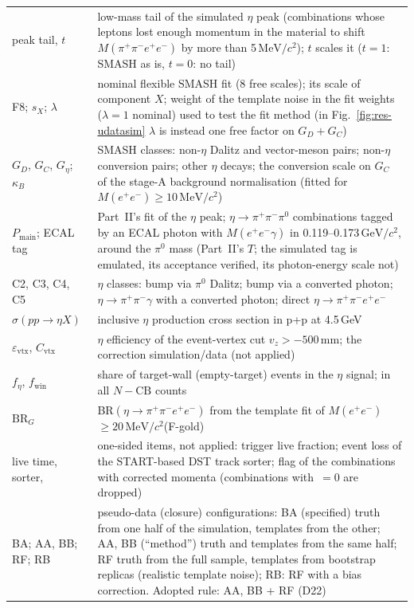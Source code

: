\documentclass[11pt,a4paper]{article}
\newcommand{\piz}{\ensuremath{\pi^{0}}\xspace}
\newcommand{\ee}{\ensuremath{e^{+}e^{-}}\xspace}
\newcommand{\pipi}{\ensuremath{\pi^{+}\pi^{-}}\xspace}
\newcommand{\ppee}{\ensuremath{\pi^{+}\pi^{-}e^{+}e^{-}}\xspace}
\newcommand{\Mfour}{\ensuremath{M(\pi^{+}\pi^{-}e^{+}e^{-})}\xspace}
\newcommand{\Mee}{\ensuremath{M(e^{+}e^{-})}\xspace}
\newcommand{\GeVcc}{\ensuremath{\mathrm{GeV}/c^{2}}\xspace}
\newcommand{\MeVcc}{\ensuremath{\mathrm{MeV}/c^{2}}\xspace}
\newcommand{\code}[1]{\texttt{\detokenize{#1}}}
\newcommand{\vz}{\ensuremath{v_z}\xspace}
\newcommand{\Pmain}{\ensuremath{P_{\mathrm{main}}}\xspace}
\newcommand{\kB}{\ensuremath{\kappa_B}\xspace}
\newcommand{\feta}{\ensuremath{f_\eta}\xspace}
\newcommand{\fwin}{\ensuremath{f_{\mathrm{win}}}\xspace}
\newcommand{\BRG}{\ensuremath{\mathrm{BR}_G}\xspace}
\newcommand{\sigeta}{\ensuremath{\sigma(pp\to\eta X)}\xspace}
\newcommand{\Geta}{\ensuremath{G_\eta}\xspace}
\begin{document}
{\begin{longtable}{@{}>{\raggedright\arraybackslash}p{3.3cm} >{\raggedright\arraybackslash}p{\dimexpr\textwidth-3.3cm-2\tabcolsep\relax}@{}}
peak tail, $t$ & low-mass tail of the simulated $\eta$ peak (combinations whose leptons lost enough momentum in the material to shift \Mfour by more
than 5\,\MeVcc); $t$ scales it ($t=1$: SMASH as is, $t=0$: no tail) \\
F8; $s_X$; $\lambda$ & nominal flexible SMASH fit (8 free scales); its scale of component $X$; weight of the template noise in the fit weights
($\lambda=1$ nominal) used to test the fit method (in Fig.~\ref{fig:res-udatasim} $\lambda$ is instead one free factor on $G_D+G_C$) \\
$G_D$, $G_C$, \Geta; \kB & SMASH classes: non-$\eta$ Dalitz and vector-meson pairs; non-$\eta$ conversion pairs; other $\eta$ decays; the
conversion scale on $G_C$ of the stage-A background normalisation (fitted for \Mee$\ge10$\,\MeVcc) \\
\Pmain; ECAL tag & Part~II's fit of the $\eta$ peak; $\eta\to\pipi\piz$ combinations tagged by an ECAL photon with $M(\ee\gamma)$ in
0.119--0.173\,\GeVcc, around the \piz mass (Part~II's $T$; the simulated tag is emulated, its acceptance verified, its photon-energy
scale not) \\
C2, C3, C4, C5 & $\eta$ classes: bump via \piz Dalitz; bump via a converted photon; $\eta\to\pipi\gamma$ with a converted photon; direct $\eta\to\ppee$ \\
\sigeta & inclusive $\eta$ production cross section in p+p at 4.5\,GeV \\
$\varepsilon_{\mathrm{vtx}}$, $C_{\mathrm{vtx}}$ & $\eta$ efficiency of the event-vertex cut $\vz>-500$\,mm; the correction simulation/data (not applied) \\
\feta, \fwin & share of target-wall (empty-target) events in the $\eta$ signal; in all $N-\mathrm{CB}$ counts \\
\BRG & BR$(\eta\to\ppee)$ from the template fit of \Mee$\ge20$\,\MeVcc (F-gold) \\
live time, sorter, \code{cor_ok} & one-sided items, not applied: trigger live fraction; event loss of the START-based DST track sorter; flag of
the combinations with corrected momenta (combinations with \code{cor_ok}$\,=0$ are dropped) \\
BA; AA, BB; RF; RB & pseudo-data (closure) configurations: BA (specified) truth from one half of the simulation, templates from the other;
AA, BB (``method'') truth and templates from the same half; RF truth from the full sample, templates from bootstrap replicas (realistic
template noise); RB: RF with a bias correction. Adopted rule: AA, BB + RF (D22) \\

\end{longtable}}
\end{document}
